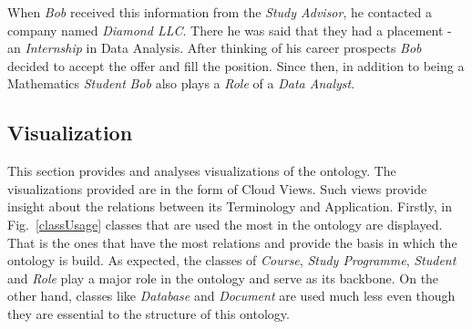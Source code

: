 \documentclass{article}    %
\begin{document}
When \textit{Bob} received this information from the \textit{Study Advisor}, he contacted a company named \textit{Diamond LLC}. There he was said that they had a placement - an \textit{Internship} in Data Analysis. After thinking of his career prospects \textit{Bob} decided to accept the offer and fill the position. Since then, in addition to being a Mathematics \textit{Student} \textit{Bob} also plays a \textit{Role} of a \textit{Data Analyst}.
% 
\subsection{Visualization}
%
This section provides and analyses visualizations of the ontology. The visualizations provided are in the form of Cloud Views. Such views provide insight about the relations between its Terminology and Application. Firstly, in Fig.~\ref{classUsage} classes that are used the most in the ontology are displayed. That is the ones that have the most relations and provide the basis in which the ontology is build. As expected, the classes of \textit{Course}, \textit{Study Programme}, \textit{Student} and \textit{Role} play a major role in the ontology and serve as its backbone. On the other hand, classes like \textit{Database} and \textit{Document} are used much less even though they are essential to the structure of this ontology.
\end{document}
